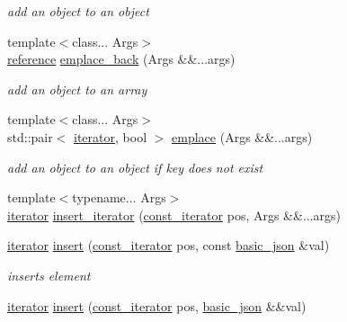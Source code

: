 \begin{DoxyCompactItemize}
\begin{DoxyCompactList}\small\item\em add an object to an object \end{DoxyCompactList}\item 
{\footnotesize template$<$class... Args$>$ }\\\hyperlink{classnlohmann_1_1basic__json_a220ae98554a76205fb7f8822d36b2d5a}{reference} \hyperlink{classnlohmann_1_1basic__json_acc5a4ed540be7ef071e4ac3c855caa78}{emplace\+\_\+back} (Args \&\&...args)
\begin{DoxyCompactList}\small\item\em add an object to an array \end{DoxyCompactList}\item 
{\footnotesize template$<$class... Args$>$ }\\std\+::pair$<$ \hyperlink{classnlohmann_1_1basic__json_aa549b2b382916b3baafb526e5cb410bd}{iterator}, bool $>$ \hyperlink{classnlohmann_1_1basic__json_ab8250fc95e669ecb5358b87d3b8c7976}{emplace} (Args \&\&...args)
\begin{DoxyCompactList}\small\item\em add an object to an object if key does not exist \end{DoxyCompactList}\item 
{\footnotesize template$<$typename... Args$>$ }\\\hyperlink{classnlohmann_1_1basic__json_aa549b2b382916b3baafb526e5cb410bd}{iterator} \hyperlink{classnlohmann_1_1basic__json_a4ffe4b6475560b0997262ee6fabfa8f9}{insert\+\_\+iterator} (\hyperlink{classnlohmann_1_1basic__json_aebd2cfa7e4ded4e97cde9269bfeeea38}{const\+\_\+iterator} pos, Args \&\&...args)
\item 
\hyperlink{classnlohmann_1_1basic__json_aa549b2b382916b3baafb526e5cb410bd}{iterator} \hyperlink{classnlohmann_1_1basic__json_aeb86e8478e20d95970a8b61ff01dce3b}{insert} (\hyperlink{classnlohmann_1_1basic__json_aebd2cfa7e4ded4e97cde9269bfeeea38}{const\+\_\+iterator} pos, const \hyperlink{classnlohmann_1_1basic__json}{basic\+\_\+json} \&val)
\begin{DoxyCompactList}\small\item\em inserts element \end{DoxyCompactList}\item 
\hyperlink{classnlohmann_1_1basic__json_aa549b2b382916b3baafb526e5cb410bd}{iterator} \hyperlink{classnlohmann_1_1basic__json_a9c5b9de8a4a759861cb600b38a6c81b1}{insert} (\hyperlink{classnlohmann_1_1basic__json_aebd2cfa7e4ded4e97cde9269bfeeea38}{const\+\_\+iterator} pos, \hyperlink{classnlohmann_1_1basic__json}{basic\+\_\+json} \&\&val)

\end{DoxyCompactItemize}
